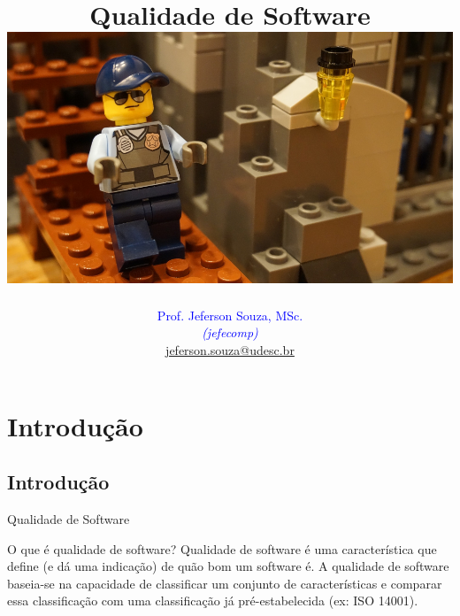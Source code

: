 \documentclass[xcolor=x11names,compress]{beamer}
\begin{document}
\title[Qualidade de Software \hskip35mm \insertframenumber / \inserttotalframenumber  \hskip36mm \inserttitlegraphic]{Qualidade de Software \\[4mm]
\includegraphics[keepaspectratio,width=.5\textwidth]{lego-ppr}}
\author[@2018 Prof. Jeferson Souza, MSc (jefecomp) - All rights reserved.]{
	\textcolor{blue}{Prof. Jeferson Souza, MSc.} \\[1mm] 
	\textcolor{blue}{\textit{{\footnotesize (jefecomp) }}}\\[1.5mm]
	 \underline{{\footnotesize jeferson.souza@udesc.br}}
	 \vspace*{1mm}
}

\date{}


\begin{frame}
\titlepage
\end{frame}

\section{Introdução}
\subsection{Introdução}
\begin{frame}{Qualidade de Software}

\begin{alertblock}{O que é qualidade de software?}
Qualidade de software é uma característica que define (e dá uma indicação) de quão bom um software é. A qualidade de software baseia-se na capacidade de classificar um conjunto de características e comparar essa classificação com uma classificação já pré-estabelecida (ex: ISO 14001).
\end{alertblock}

\end{frame}
\end{document}
